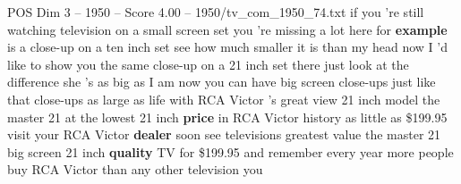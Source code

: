 \begin{textsample}{POS Dim 3 – 1950 – Score 4.00 – 1950/tv\_com\_1950\_74.txt}  \label{ex:f3_pos_012}
if you 're still watching television on a small screen set you 're missing a lot here for \textbf{example} is a close-up on a ten inch set see how much smaller it is than my head now I 'd like to show you the same close-up on a 21 inch set there just look at the difference she 's as big as I am now you can have big screen close-ups just like that close-ups as large as life with RCA Victor 's great view 21 inch model the master 21 at the lowest 21 inch \textbf{price} in RCA Victor history as little as \$199.95 visit your RCA Victor \textbf{dealer} soon see televisions greatest value the master 21 big screen 21 inch \textbf{quality} TV for \$199.95 and remember every year more people buy RCA Victor than any other television you

\end{textsample}
